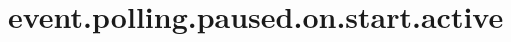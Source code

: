 \section{event.polling.paused.on.start.active}
\label{configuration:EventPollingPausedOnStartActive}
\TODO
